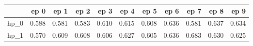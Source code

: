 \begin{tabular}{lrrrrrrrrrr}
\toprule
{} &   ep 0 &   ep 1 &   ep 2 &   ep 3 &   ep 4 &   ep 5 &   ep 6 &   ep 7 &   ep 8 &   ep 9 \\
\midrule
hp\_0 &  0.588 &  0.581 &  0.583 &  0.610 &  0.615 &  0.608 &  0.636 &  0.581 &  0.637 &  0.634 \\
hp\_1 &  0.570 &  0.609 &  0.608 &  0.606 &  0.627 &  0.605 &  0.636 &  0.683 &  0.630 &  0.625 \\
\bottomrule
\end{tabular}
